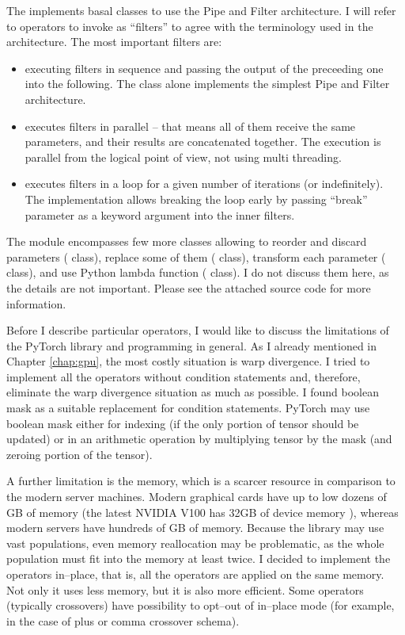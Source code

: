 The  implements basal classes to use the Pipe and Filter architecture. I will refer to operators to invoke as \enquote{filters} to agree with the terminology used in the architecture. The most important filters are:
\begin{itemize}
    \item {} executing filters in sequence and passing the output of the preceeding one into the following. The  class alone implements the simplest Pipe and Filter architecture.
    \item {} executes filters in parallel -- that means all of them receive the same parameters, and their results are concatenated together. The execution is parallel from the logical point of view, not using multi threading.
    \item {} executes filters in a loop for a given number of iterations (or indefinitely). The implementation allows breaking the loop early by passing \enquote{break} parameter as a keyword argument into the inner filters.
\end{itemize}
The module encompasses few more classes allowing to reorder and discard parameters ( class), replace some of them ( class), transform each parameter ( class), and use Python lambda function ( class). I do not discuss them here, as the details are not important. Please see the attached source code for more information.

Before I describe particular operators, I would like to discuss the limitations of the PyTorch library and \gpu programming in general. As I already mentioned in Chapter \ref{chap:gpu}, the most costly situation is warp divergence. I tried to implement all the operators without condition statements and, therefore, eliminate the warp divergence situation as much as possible. I found boolean mask as a suitable replacement for condition statements. PyTorch may use boolean mask either for indexing (if the only portion of tensor should be updated) or in an arithmetic operation by multiplying tensor by the mask (and zeroing portion of the tensor).

A further limitation is the \gpu memory, which is a scarcer resource in comparison to the modern server machines. Modern graphical cards have up to low dozens of GB of memory (the latest NVIDIA V100 has 32GB of device memory \citep{nvidiav100spec}), whereas modern servers have hundreds of GB of memory. Because the library may use vast populations, even memory reallocation may be problematic, as the whole population must fit into the memory at least twice. I decided to implement the operators in--place, that is, all the operators are applied on the same memory. Not only it uses less memory, but it is also more efficient. Some operators (typically crossovers) have possibility to opt--out of in--place mode (for example, in the case of plus or comma crossover schema).

